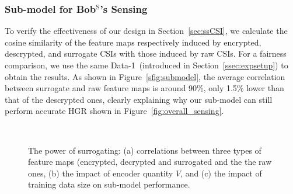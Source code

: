 \documentclass[conference,compsoc]{IEEEtran}
\begin{document}
\subsubsection{Sub-model for Bob$^{\mathrm{S}}$'s Sensing}\label{sssec:submodel}
%
To verify the effectiveness of our design in Section~\ref{sec:ssCSI}, we calculate the cosine similarity of the feature maps respectively induced by encrypted, descrypted, and surrogate CSIs with those induced by raw CSIs.  For a fairness comparison, we use the same Data-1~(introduced in Section~\ref{ssec:expsetup}) to obtain the results. As shown in Figure~\ref{sfig:submodel}, the average correlation between surrogate and raw feature maps is around 90\%, only 1.5\% lower than that of the descrypted ones, clearly explaining why our sub-model can still perform accurate HGR shown in Figure~\ref{fig:overall_sensing}. 
%
\begin{figure}[b]
	\setlength\abovecaptionskip{8pt}
	\vspace{-2ex}
	\centering
	\\
        \vspace{-1ex}
	\caption{The power of surrogating: (a) correlations between three types of feature maps (encrypted, decrypted and surrogated and the
     the raw ones, (b) the impact of encoder quantity $V$, and (c) the impact of training data size on sub-model performance.}
	\label{fig:submodel_per}
	\vspace{-.5ex}
\end{figure}
\end{document}
